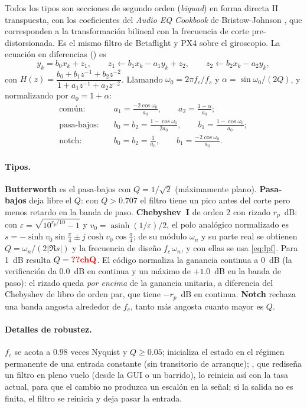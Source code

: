 Todos los tipos son secciones de segundo orden (\emph{biquad}) en forma
directa II transpuesta, con los coeficientes del \emph{Audio EQ Cookbook} de
Bristow-Johnson \cite{rbj}, que corresponden a la transformación bilineal
con la frecuencia de corte pre-distorsionada. Es el mismo filtro de
Betaflight y PX4 sobre el giroscopio. La ecuación en diferencias
() es
\begin{equation}
y_k = b_0x_k + z_1,\qquad
z_1 \leftarrow b_1x_k - a_1y_k + z_2,\qquad
z_2 \leftarrow b_2x_k - a_2y_k ,
\label{eq:df2t}
\end{equation}
con $H(z)=\dfrac{b_0+b_1z^{-1}+b_2z^{-2}}{1+a_1z^{-1}+a_2z^{-2}}$. Llamando
$\omega_0=2\pi f_c/f_s$ y $\alpha=\sin\omega_0/(2Q)$, y normalizando por
$a_0=1+\alpha$:
\begin{align}
\text{común:}\quad & a_1=\tfrac{-2\cos\omega_0}{a_0},\qquad a_2=\tfrac{1-\alpha}{a_0};\nonumber\\
\text{pasa-bajos:}\quad & b_0=b_2=\tfrac{1-\cos\omega_0}{2a_0},\qquad b_1=\tfrac{1-\cos\omega_0}{a_0};\label{eq:lpf}\\
\text{notch:}\quad & b_0=b_2=\tfrac{1}{a_0},\qquad b_1=\tfrac{-2\cos\omega_0}{a_0}.\label{eq:notch}
\end{align}

\paragraph{Tipos.} \textbf{Butterworth} es el pasa-bajos con $Q=1/\sqrt2$
(máximamente plano). \textbf{Pasa-bajos} deja libre el $Q$: con $Q>0.707$
el filtro tiene un pico antes del corte pero menos retardo en la banda de
paso. \textbf{Chebyshev~I} de orden 2 con rizado $r_p$~dB: con
$\varepsilon=\sqrt{10^{r_p/10}-1}$ y $v_0=\operatorname{asinh}(1/\varepsilon)/2$,
el polo analógico normalizado es
$s=-\sinh v_0\sin\frac{\pi}{4}\pm j\cosh v_0\cos\frac{\pi}{4}$; de su módulo
$\omega_n$ y su parte real se obtienen $Q=\omega_n/(2|\Re s|)$ y la frecuencia
de diseño $f_c\,\omega_n$, y con ellas se usa \eqref{eq:lpf}. Para 1~dB
resulta $Q=\val{chQ}$. El código normaliza la ganancia continua a 0~dB (la
verificación da 0.0~dB en continua y un máximo de $+1.0$~dB en la banda de
paso): el rizado queda \emph{por encima} de la
ganancia unitaria, a diferencia del Chebyshev de libro de orden par, que
tiene $-r_p$~dB en continua. \textbf{Notch} rechaza una banda angosta
alrededor de $f_c$, tanto más angosta cuanto mayor es $Q$.

\paragraph{Detalles de robustez.} $f_c$ se acota a $0.98$ veces Nyquist y
$Q\ge0.05$;  inicializa el estado en el régimen permanente de
una entrada constante (sin transitorio de arranque); ,
que rediseña un filtro en pleno vuelo (desde la GUI o un barrido), lo reinicia
así con la tasa actual, para que el cambio no produzca un escalón en la
señal; si la salida no es finita, el filtro se reinicia y deja pasar la
entrada.

